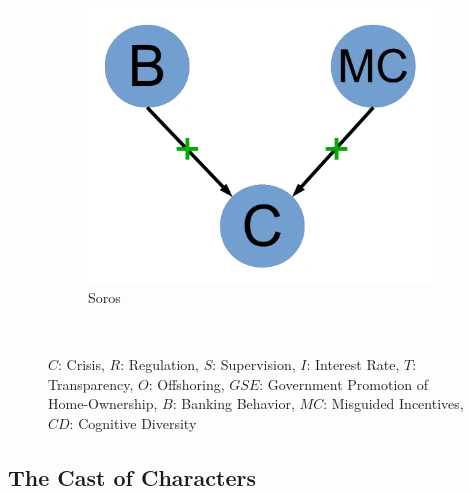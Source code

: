 \documentclass[11pt]{article}
\begin{document}
\begin{figure}
\begin{subfigure}[b]{0.2\textwidth}
                \includegraphics[width=\textwidth]{soros.pdf}
                \caption{\footnotesize Soros}
                \label{fig:soros}
        \end{subfigure}
        ~ %
       \caption{$C$: Crisis, $R$: Regulation, $S$: Supervision, $I$: Interest Rate, $T$: Transparency, $O$: Offshoring, $GSE$: Government Promotion of Home-Ownership, $B$: Banking Behavior, $MC$: Misguided Incentives, $CD$: Cognitive Diversity}\label{fig:committe1}
\end{figure}
\subsection{The Cast of Characters}
\label{sec-4-1}
\end{document}
